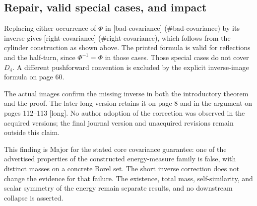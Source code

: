 \documentclass[10pt]{article}
\begin{document}
\subsection*{Repair, valid special cases, and impact}
Replacing either occurrence of \(\Phi\) in [bad-covariance] (\#bad-covariance) by its inverse gives [right-covariance] (\#right-covariance), which follows from the cylinder construction as shown above. The printed formula is valid for reflections and the half-turn, since \(\Phi^{-1}=\Phi\) in those cases. Those special cases do not cover \(D_4\). A different pushforward convention is excluded by the explicit inverse-image formula on page 60.\par
The actual images confirm the missing inverse in both the introductory theorem and the proof. The later long version retains it on page 8 and in the argument on pages 112–113 [long]. No author adoption of the correction was observed in the acquired versions; the final journal version and unacquired revisions remain outside this claim.\par
This finding is Major for the stated core covariance guarantee: one of the advertised properties of the constructed energy-measure family is false, with distinct masses on a concrete Borel set. The short inverse correction does not change the evidence for that failure. The existence, total mass, self-similarity, and scalar symmetry of the energy remain separate results, and no downstream collapse is asserted.\par
\end{document}
